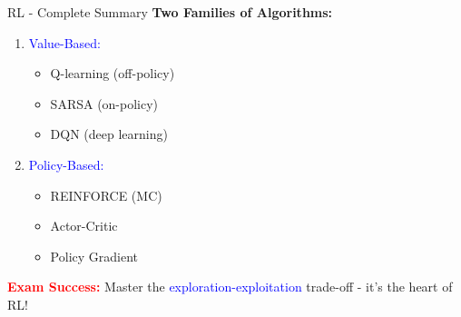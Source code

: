 \documentclass[8pt]{beamer}
\begin{document}
\begin{frame}{RL - Complete Summary}
		\textbf{Two Families of Algorithms:}
		\begin{enumerate}
			\item \textcolor{blue}{Value-Based:}
			\begin{itemize}
				\item Q-learning (off-policy)
				\item SARSA (on-policy)
				\item DQN (deep learning)
			\end{itemize}
			\item \textcolor{blue}{Policy-Based:}
			\begin{itemize}
				\item REINFORCE (MC)
				\item Actor-Critic
				\item Policy Gradient
			\end{itemize}
		\end{enumerate}
		
		\textcolor{red}{\textbf{Exam Success:}} Master the \textcolor{blue}{exploration-exploitation} trade-off - it's the heart of RL!
	\end{frame}
	
\end{document}
